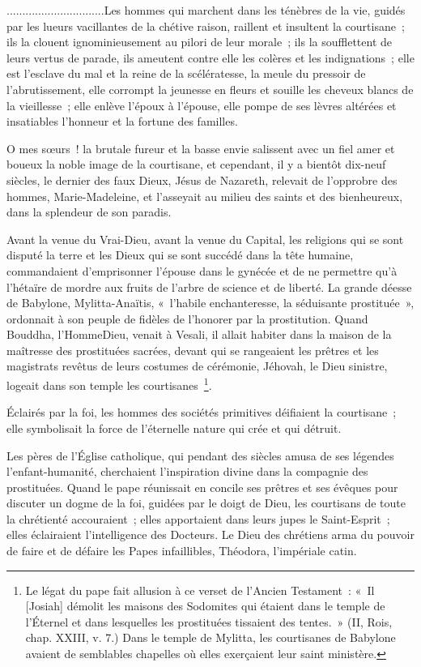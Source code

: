 \documentclass[french,twoside]{book} %
\begin{document}
\noindent ...............................Les hommes qui marchent dans les ténèbres de la vie, guidés par les lueurs vacillantes de la chétive raison, raillent et insultent la courtisane ; ils la clouent ignominieusement au pilori de leur morale ; ils la soufflettent de leurs vertus de parade, ils ameutent contre elle les colères et les indignations ; elle est l’esclave du mal et la reine de la scélératesse, la meule du pressoir de l’abrutissement, elle corrompt la jeunesse en fleurs et souille les cheveux blancs de la vieillesse ; elle enlève l’époux à l’épouse, elle pompe de ses lèvres altérées et insatiables l’honneur et la fortune des familles.\par
O mes sœurs ! la brutale fureur et la basse envie salissent avec un fiel amer et boueux la noble image de la courtisane, et cependant, il y a bientôt dix-neuf siècles, le dernier des faux Dieux, Jésus de Nazareth, relevait de l’opprobre des hommes, Marie-Madeleine, et l’asseyait au milieu des saints et des bienheureux, dans la splendeur de son paradis.\par
Avant la venue du Vrai-Dieu, avant la venue du Capital, les religions qui se sont disputé la terre et les Dieux qui se sont succédé dans la tête humaine, commandaient d’emprisonner l’épouse dans le gynécée et de ne permettre qu’à l’hétaïre de mordre aux fruits de l’arbre de science et de liberté. La grande déesse de Babylone, Mylitta-Anaïtis, « l’habile enchanteresse, la séduisante prostituée », ordonnait à son peuple de fidèles de l’honorer par la prostitution. Quand Bouddha, l’HommeDieu, venait à Vesali, il allait habiter dans la maison de la maîtresse des prostituées sacrées, devant qui se rangeaient les prêtres et les magistrats revêtus de leurs costumes de cérémonie, Jéhovah, le Dieu sinistre, logeait dans son temple les courtisanes \footnote{Le légat du pape fait allusion à ce verset de l’Ancien Testament : « Il [Josiah] démolit les maisons des Sodomites qui étaient dans le temple de l’Éternel et dans lesquelles les prostituées tissaient des tentes. » (II, Rois, chap. XXIII, v. 7.) Dans le temple de Mylitta, les courtisanes de Babylone avaient de semblables chapelles où elles exerçaient leur saint ministère.}.\par
Éclairés par la foi, les hommes des sociétés primitives déifiaient la courtisane ; elle symbolisait la force de l’éternelle nature qui crée et qui détruit.\par
Les pères de l’Église catholique, qui pendant des siècles amusa de ses légendes l’enfant-humanité, cherchaient l’inspiration divine dans la compagnie des prostituées. Quand le pape réunissait en concile ses prêtres et ses évêques pour discuter un dogme de la foi, guidées par le doigt de Dieu, les courtisans de toute la chrétienté accouraient ; elles apportaient dans leurs jupes le Saint-Esprit ; elles éclairaient l’intelligence des Docteurs. Le Dieu des chrétiens arma du pouvoir de faire et de défaire les Papes infaillibles, Théodora, l’impériale catin.\par
\end{document}
